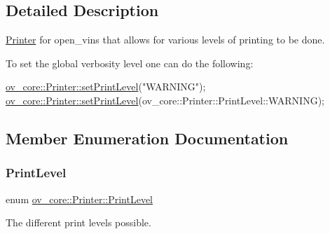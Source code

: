\subsection{Detailed Description}
\hyperlink{classov__core_1_1Printer}{Printer} for open\+\_\+vins that allows for various levels of printing to be done. 

To set the global verbosity level one can do the following\+: 
\begin{DoxyCode}
\hyperlink{classov__core_1_1Printer_a46c933308a512618c304afefee62ead8}{ov\_core::Printer::setPrintLevel}(\textcolor{stringliteral}{"WARNING"});
\hyperlink{classov__core_1_1Printer_a46c933308a512618c304afefee62ead8}{ov\_core::Printer::setPrintLevel}(ov\_core::Printer::PrintLevel::WARNING);
\end{DoxyCode}
 

\subsection{Member Enumeration Documentation}
\mbox{\label{classov__core_1_1Printer_a1c4c6c612ec6251afd91a1ddf933a0b2}} 
\subsubsection{\texorpdfstring{Print\+Level}{PrintLevel}}
{\footnotesize\ttfamily enum \hyperlink{classov__core_1_1Printer_a1c4c6c612ec6251afd91a1ddf933a0b2}{ov\+\_\+core\+::\+Printer\+::\+Print\+Level}}



The different print levels possible. 


